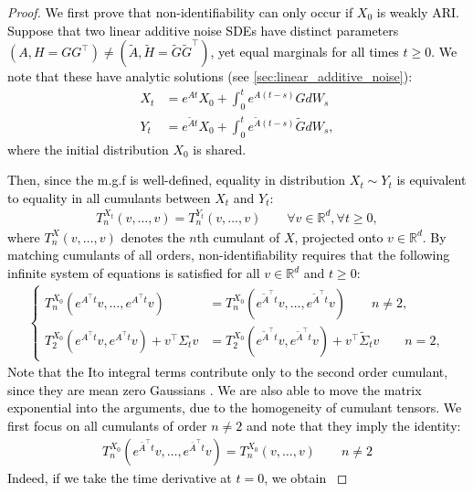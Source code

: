 \documentclass[twoside,11pt]{article}
\newcommand{\R} {\mathbb R}
\newcommand{\rv}[1]{\textcolor{black}{#1}}
\begin{document}
\begin{proof}
\rv{We first prove that non-identifiability can only occur if $X_0$ is weakly ARI. Suppose that two linear additive noise SDEs have distinct parameters $(A, H=GG^\top) \neq (\tilde{A}, \tilde{H}=\tilde{G}\tilde{G}^\top)$, yet equal marginals for all times $t \ge 0$. We note that these have analytic solutions (see \cref{sec:linear_additive_noise}):
\begin{align*}
    X_t &= e^{At}X_0 + \int_0^t e^{A(t-s)}GdW_s\\
    Y_t &= e^{\tilde{A}t}X_0 + \int_0^t e^{\tilde{A}(t-s)}\tilde{G}dW_s,
\end{align*}
where the initial distribution $X_0$ is shared. }

\rv{Then, since the m.g.f is well-defined, equality in distribution $X_t \sim Y_t$ is equivalent to equality in all cumulants between $X_t$ and $Y_t$:
\begin{align}
    T_n^{X_t}(v, \ldots, v) = T_n^{Y_t}(v, \ldots, v) \qquad \forall v \in \R^d, \forall t \ge 0,
\end{align}
where $T_n^{X}(v, \ldots, v)$ denotes the $n$th cumulant of $X$, projected onto $v \in \R^d$. By matching cumulants of all orders, non-identifiability requires that the following infinite system of equations is satisfied for all $v \in \R^d$ and $t \ge 0$:
\begin{align}
    \begin{cases}
T_n^{X_0}(e^{A^\top t}v, \ldots, e^{A^\top t}v)&=T_n^{X_0}(e^{\tilde{A}^\top t}v, \ldots, e^{\tilde{A}^\top t}v) \qquad n \neq 2,\\
T_2^{X_0}(e^{A^\top t}v, e^{A^\top t}v) + v^\top\Sigma_t v &= T_2^{X_0}(e^{\tilde{A}^\top t}v, e^{\tilde{A}^\top t}v) + v^\top\tilde{\Sigma}_t v \qquad n=2,
\end{cases}
\label{eq:all_cumulant_eqs}
\end{align}
Note that the Ito integral terms contribute only to the second order cumulant, since they are mean zero Gaussians \citep{marcinkiewicz1939propriete}. We are also able to move the matrix exponential into the arguments, due to the homogeneity of cumulant tensors. We first focus on all cumulants of order $n \neq 2$ and note that they imply the identity:
\begin{align}
    T_n^{X_0}(e^{\bar{A}^\top t}v, \ldots, e^{\bar{A}^\top t}v)=T_n^{X_0}(v, \ldots, v) \qquad n \neq 2
\label{eq:higher_order_cumulants}
\end{align}
Indeed, if we take the time derivative at $t=0$, we obtain
}
\end{proof}
\end{document}
